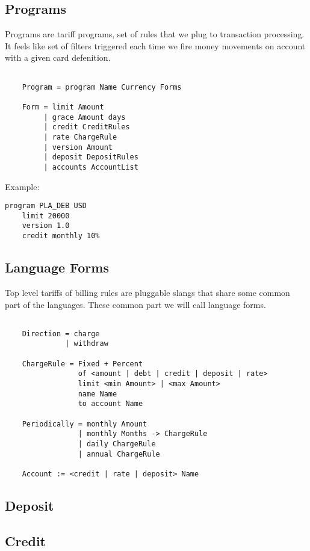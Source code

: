 \newpage
\subsection{Programs}

Programs are tariff programs, set of rules that we plug to transaction processing.
It feels like set of filters triggered each time we fire money
movements on account with a given card defenition.

\vspace{1\baselineskip}
\begin{lstlisting}[caption=BNF]

    Program = program Name Currency Forms

    Form = limit Amount
         | grace Amount days
         | credit CreditRules
         | rate ChargeRule
         | version Amount
         | deposit DepositRules
         | accounts AccountList
\end{lstlisting}
\vspace{1\baselineskip}

Example:

\vspace{1\baselineskip}
\begin{lstlisting}[caption=credit.card]
    program PLA_DEB USD
    limit 20000
    version 1.0
    credit monthly 10%
\end{lstlisting}
\vspace{1\baselineskip}

\newpage
\subsection{Language Forms}

Top level tariffs of billing rules are pluggable slangs that
share some common part of the languages. These common part we will
call language forms.

\vspace{1\baselineskip}
\begin{lstlisting}[caption=BNF]

    Direction = charge 
              | withdraw

    ChargeRule = Fixed + Percent
                 of <amount | debt | credit | deposit | rate>
                 limit <min Amount> | <max Amount>
                 name Name
                 to account Name

    Periodically = monthly Amount 
                 | monthly Months -> ChargeRule
                 | daily ChargeRule
                 | annual ChargeRule

    Account := <credit | rate | deposit> Name

\end{lstlisting}
\vspace{1\baselineskip}

\subsection{Deposit}

\subsection{Credit}

